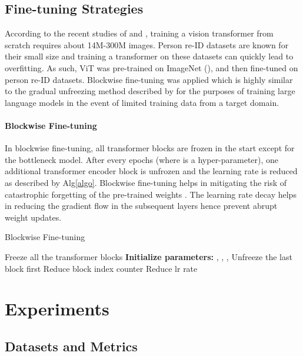\documentclass{article}
\begin{document}
\subsection{Fine-tuning Strategies}
According to the recent studies of \citet{Deit} and \citet{ViT}, training a vision transformer from scratch requires about 14M-300M images. Person re-ID datasets are known for their small size and training a transformer on these datasets can quickly lead to overfitting.  As such, ViT was pre-trained on ImageNet (\citet{imagenet21k}), and then fine-tuned on person re-ID datasets. Blockwise fine-tuning was applied which is highly similar to the gradual unfreezing method described by \citet{ULMFit} for the purposes of training large language models in the event of limited training data from a target domain. 

\paragraph{Blockwise Fine-tuning}\label{Blockwise}
In blockwise fine-tuning, all transformer blocks are frozen in the start except for the bottleneck model. After every  epochs (where  is a hyper-parameter), one additional transformer encoder block is unfrozen and the learning rate is reduced as described by Alg\ref{algo}. Blockwise fine-tuning helps in mitigating the risk of catastrophic forgetting of the pre-trained weights \citep{ULMFit}. The learning rate decay helps in reducing the gradient flow in the subsequent layers hence prevent abrupt weight updates. 

\begin{algorithm}
\label{algo}
\caption{Blockwise Fine-tuning}
\begin{algorithmic}[1]
\State Freeze all the transformer blocks 
\State \textbf{Initialize parameters:} , , , 
\While{}  
    \If{}  
        \State   \Comment Unfreeze the last block first
        \State   \Comment Reduce block index counter
        \State  \Comment Reduce lr rate
    \EndIf
\EndWhile 
\end{algorithmic}
\end{algorithm}

\section{Experiments}

\subsection{Datasets and Metrics}
\end{document}
